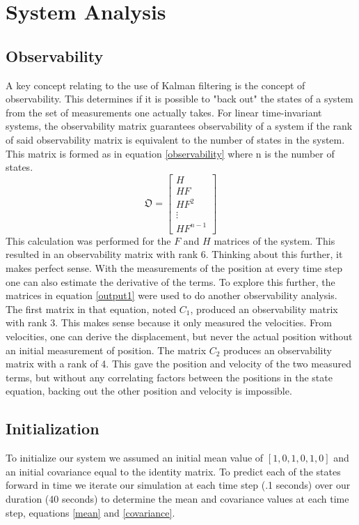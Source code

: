 \documentclass[12pt]{extarticle}
\begin{document}
\section{System Analysis}{

\subsection{Observability}{
    A key concept relating to the use of Kalman filtering is the concept of observability. This determines if it is possible to "back out" the states of a system from the set of measurements one actually takes. For linear time-invariant systems, the observability matrix guarantees observability of a system if the rank of said observability matrix is equivalent to the number of states in the system. This matrix is formed as in equation \ref{observability} where n is the number of states.
    \begin{equation}\label{observability}
        \mathfrak{O}=\begin{bmatrix}H\\HF\\HF^2\\\vdots\\HF^{n-1}\end{bmatrix}
    \end{equation}
    This calculation was performed for the $F$ and $H$ matrices of the system. This resulted in an observability matrix with rank 6. Thinking about this further, it makes perfect sense. With the measurements of the position at every time step one can also estimate the derivative of the terms. To explore this further, the matrices in equation \ref{output1} were used to do another observability analysis. The first matrix in that equation, noted $C_1$, produced an observability matrix with rank 3. This makes sense because it only measured the velocities. From velocities, one can derive the displacement, but never the actual position without an initial measurement of position. The matrix $C_2$ produces an observability matrix with a rank of 4. This gave the position and velocity of the two measured terms, but without any correlating factors between the positions in the state equation, backing out the other position and velocity is impossible.
}
\subsection{Initialization}{
To initialize our system we assumed an initial mean value of $[1, 0, 1, 0, 1,0]$ and an initial covariance equal to the identity matrix.  To predict each of the states forward in time we iterate our simulation at each time step (.1 seconds) over our duration (40 seconds) to determine the mean and covariance values at each time step, equations \ref{mean} and \ref{covariance}.

}}
\end{document}
